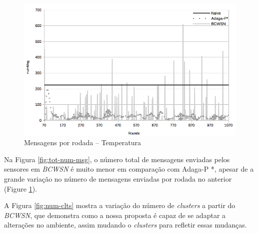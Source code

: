 \documentclass{acm_proc_article-sp}
\begin{document}
\begin{figure}[!htb]
\begin{center}
	\includegraphics[scale=0.28]{BCWSN-NumMsgPerRoundxRound-PB-Temp.png}
	 \vspace*{-.6cm}
	 \caption{Mensagens por rodada – Temperatura} 
    \label{fig:num-msg}
\end{center}
\end{figure}
\vspace*{-.6cm}


Na Figura \ref{fig:tot-num-msg}, o número total de mensagens enviadas pelos
sensores em {\it BCWSN} é muito menor em comparação com Adaga-P *,
{ apesar de a grande variação no número de mensagens enviadas por rodada no
anterior (Figure \ref{fig:num-msg}).} 
\vspace*{-.3cm}

A Figura \ref{fig:num-clts} mostra a variação do número de {\it clusters}
a partir do {\it BCWSN}, que demonstra como a nossa proposta é capaz de se
adaptar a alterações no ambiente, assim mudando o {\it clusters} para refletir
essas mudanças.
\vspace*{-.3cm}
\end{document}
